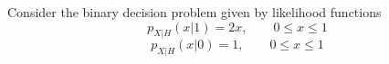 \begin{solution}
\end{solution}

\else

\question[25] %

Consider the binary decision problem given by likelihood functions
$$p_{X|H}(x|1) = 2 x, \qquad 0\le x\le 1$$
$$p_{X|H}(x|0) = 1,   \qquad 0\le x\le 1$$

